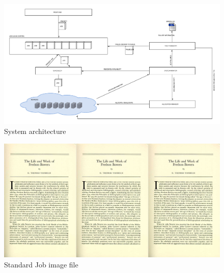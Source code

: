 \documentclass[a4paper]{IEEEtran}
\begin{document}
\begin{landscape}
\appendix

\begin{figure}[h]
\centering
\includegraphics[width=700pt]{"System Architecture 2"}
\caption{System architecture}
\label{fig_sysarch}
\end{figure}
\end{landscape}
\clearpage

\begin{landscape}
\appendix

\begin{figure}[h]
\centering
\includegraphics[width=700pt]{standardfile}
\caption{Standard Job image file}
\label{fig_standardjob}
\end{figure}
\end{landscape}
\clearpage
\end{document}
